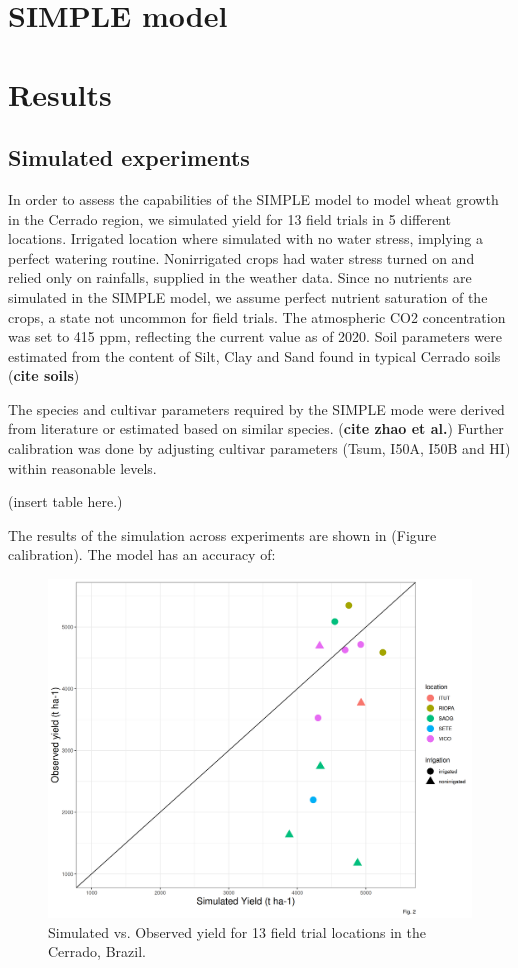 \documentclass[11pt]{article}
\begin{document}
\section{SIMPLE model}
\label{sec:org4d409c4}

\section{Results}
\label{sec:org0cdc48c}
\subsection{Simulated experiments}
\label{sec:orgbbd96e3}
In order to assess the capabilities of the SIMPLE model to model wheat growth in the Cerrado region, we simulated yield for 13 field trials in 5 different locations. Irrigated location where simulated with no water stress, implying a perfect watering routine. Nonirrigated crops had water stress turned on and relied only on rainfalls, supplied in the weather data. Since no nutrients are simulated in the SIMPLE model, we assume perfect nutrient saturation of the crops, a state not uncommon for field trials. The atmospheric CO2 concentration was set to 415 ppm, reflecting the current value as of 2020. Soil parameters were estimated from the content of Silt, Clay and Sand found in typical Cerrado soils (\textbf{cite soils})

The species and cultivar parameters required by the SIMPLE mode were derived from literature or estimated based on similar species. (\textbf{cite zhao et al.}) Further calibration was done by adjusting cultivar parameters (Tsum, I50A, I50B and HI) within reasonable levels.

(insert table here.)

The results of the simulation across experiments are shown in (Figure calibration). The model has an accuracy of:

\begin{figure}[htbp]
\centering
\includegraphics[width=.9\linewidth]{../results/experimental-data/2023-02-18_Obs_Sim_all_415.png}
\caption{Simulated vs. Observed yield for 13 field trial locations in the Cerrado, Brazil.}
\end{figure}
\end{document}
